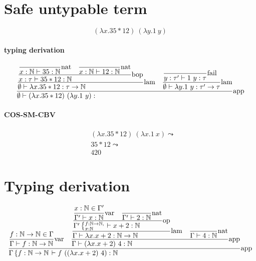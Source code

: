 \documentclass{article}
\newcommand{\st}[3][]{\ensuremath{\displaystyle\frac{#3\hfill}{#2\hfill} \text{#1}}}
\newcommand{\N}{\ensuremath \mathbb N}
\newcommand{\lam}[2]{\ensuremath{\lambda#1.#2}}
\begin{document}
\section{Safe untypable term}
\begin{equation*}
    (\lam{x}{35*12})\ (\lam{y}{1\ y})
\end{equation*}

\paragraph{typing derivation}
\begin{align*}
    \st[app]{
        \emptyset\vdash (\lam{x}{35*12})\ (\lam{y}{1\ y}): 
    }{
        \st[lam]{
            \emptyset\vdash \lam{x}{35*12}:\tau\to\N
        }{
            \st[bop]{
                x:\tau\vdash 35*12:\N
            }{
                \st[nat]{
                    x:\N\vdash 35:\N
                }{}
                \quad
                \st[nat]{
                    x:\N\vdash 12:\N
                }{}
            }
        }
        \quad
        \st[lam]{
            \emptyset\vdash \lam{y}{1\ y}: \tau'\to\tau
        }{
            \st[fail]{
                y:\tau'\vdash 1\ y: \tau
            }{}
        }
    }
\end{align*}

\paragraph{COS-SM-CBV}
\begin{align*}
    & (\lam{x}{35*12})\ (\lam{x}{1\ x}) \leadsto \\
    & 35*12 \leadsto \\
    & 420
\end{align*}

\section{Typing derivation}
\begin{equation*}
    \st[app]{
        \Gamma\left\{f:\N\to\N\right. \vdash f\ ((\lam{x}{x+2})\ 4): \N
    }{
        \st[var]{
            \Gamma \vdash f:\N\to\N
        }{
            f:\N\to\N \in \Gamma
        }
        \quad
        \st[app]{
            \Gamma\vdash (\lam{x}{x+2})\ 4: \N
        }{
            \st[lam]{
                \Gamma\vdash \lam{x}{x+2}:\N\to\N
            }{
                \st[op]{
                    \Gamma'\left\{\substack{f:\N\to\N\hfill,\\x:\N\hfill}\right.\vdash x+2:\N
                }{
                    \st[var]{
                        \Gamma'\vdash x:\N
                    }{
                        x:\N\in\Gamma'
                    }
                    \quad
                    \st[nat]{
                        \Gamma'\vdash 2:\N
                    }{
                    }
                }
            }
            \quad
            \st[nat]{
                \Gamma\vdash 4:\N
            }{}
        }
    }
\end{equation*}
\end{document}

